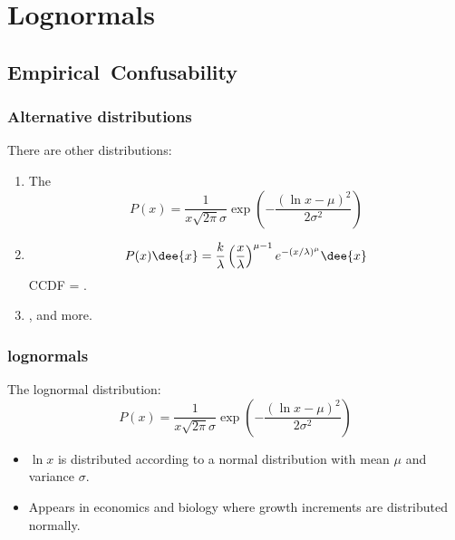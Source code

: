 
\section{Lognormals}

\subsection{Empirical\ Confusability}

\begin{frame}
  \frametitle{Alternative distributions}

  \begin{block}{There are other  distributions:}
    \begin{enumerate}
    \item<1-> 
      The 
      $$
      P(x) = \frac{1}{x \sqrt{2\pi} \sigma}
      \exp 
      \left(
        -\frac{(\ln x-\mu)^2}
        {2\sigma^2}
      \right)
      $$
    \item<2-> 
      $$ 
      P(x) \dee{x}
      =
      \frac{k}{\lambda}
      \left(
        \frac{x}{\lambda}
      \right)^{\mu-1} 
      e^{-(x/\lambda)^\mu}
      \dee{x}
      $$
      CCDF = .
    \item<3-> 
      , and more.
    \end{enumerate}
  \end{block}

\end{frame}

\begin{frame}
  \frametitle{lognormals}

  \begin{block}{The lognormal distribution:}
    $$
    P(x) = \frac{1}{x \sqrt{2\pi} \sigma}
    \exp 
    \left(
      -\frac{(\ln x-\mu)^2}
      {2\sigma^2}
    \right)
    $$
  \begin{itemize}
  \item $\ln x$ is distributed according 
    to a normal distribution with mean $\mu$ and variance $\sigma$.
  \item Appears in economics and biology where 
    growth increments are distributed normally.
  \end{itemize}
  \end{block}

\end{frame}

